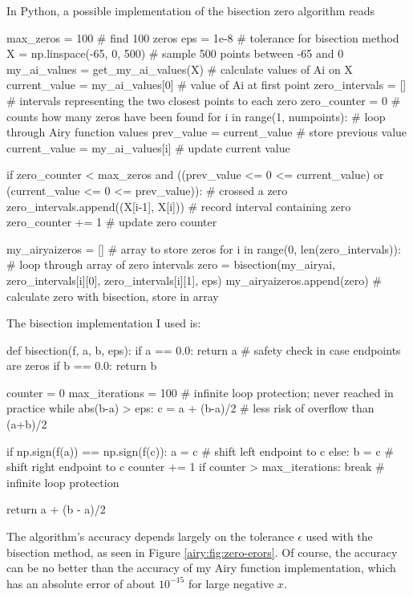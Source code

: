 \documentclass[11pt, a4paper]{article}
\begin{document}
In Python, a possible implementation of the bisection zero algorithm reads
\begin{myminted}
max_zeros = 100                     # find 100 zeros
eps = 1e-8                          # tolerance for bisection method
X = np.linspace(-65, 0, 500)        # sample 500 points between -65 and 0
my_ai_values = get_my_ai_values(X)	# calculate values of Ai on X
current_value = my_ai_values[0]     # value of Ai at first point
zero_intervals = []   # intervals representing the two closest points to each zero
zero_counter = 0      # counts how many zeros have been found
for i in range(1, numpoints):  # loop through Airy function values
    prev_value = current_value         # store previous value
    current_value = my_ai_values[i]    # update current value

    if zero_counter < max_zeros and ((prev_value <= 0 <= current_value) or (current_value <= 0 <= prev_value)):  # crossed a zero
        zero_intervals.append((X[i-1], X[i]))  # record interval containing zero
        zero_counter += 1                      # update zero counter

my_airyaizeros = []                       # array to store zeros
for i in range(0, len(zero_intervals)):   # loop through array of zero intervals
    zero = bisection(my_airyai, zero_intervals[i][0], zero_intervals[i][1], eps)
    my_airyaizeros.append(zero)   # calculate zero with bisection, store in array
\end{myminted}

The bisection implementation I used is:
\begin{myminted}
def bisection(f, a, b, eps):
    if a == 0.0: return a   # safety check in case endpoints are zeros
    if b == 0.0: return b
	
    counter = 0
    max_iterations = 100  # infinite loop protection; never reached in practice
    while abs(b-a) > eps:
        c = a + (b-a)/2   # less risk of overflow than (a+b)/2
        
        if np.sign(f(a)) == np.sign(f(c)): a = c   # shift left endpoint to c
        else: b = c                                # shift right endpoint to c
        counter += 1
        if counter > max_iterations: break  # infinite loop protection

    return a + (b - a)/2

\end{myminted}
The algorithm's accuracy depends largely on the tolerance $ \epsilon $ used with the bisection method, as seen in Figure \ref{airy:fig:zero-erors}. Of course, the accuracy can be no better than the accuracy of my Airy function implementation, which has an absolute error of about $ 10^{-15} $ for large negative $ x $.
\end{document}

